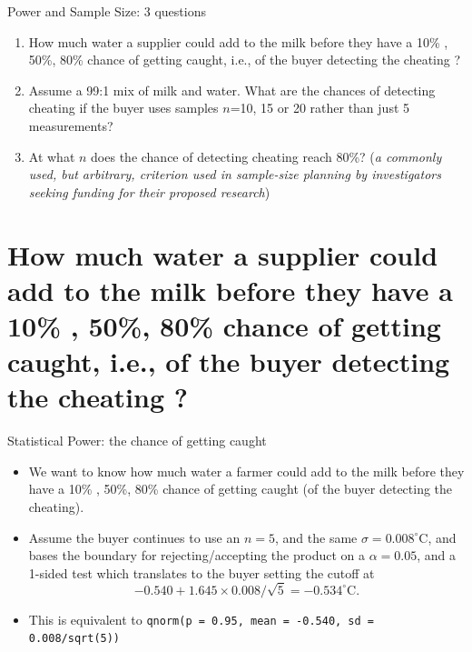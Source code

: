 \documentclass[10pt]{beamer}\usepackage[]{graphicx}\usepackage[]{color}
\begin{document}
\begin{frame}{Power and Sample Size: 3 questions}
	
	\begin{enumerate}
		\setlength\itemsep{1em}
		\item How much water a supplier could add to the milk before they have a 10\% , 50\%, 80\%
		chance of getting caught, i.e., of the buyer detecting the cheating ? \pause
		\item Assume a 99:1 mix of milk and water. What are the chances of detecting cheating if the buyer uses samples $n$=10, 15 or 20 rather than just 5 measurements? \pause
		\item At what $n$ does the chance of detecting cheating reach 80\%? (\textit{a commonly used, but arbitrary, criterion used in sample-size planning by investigators seeking funding for their proposed research})
	\end{enumerate}
	
\end{frame}


\section{How much water a supplier could add to the milk before they have a 10\% , 50\%, 80\% chance of getting caught, i.e., of the buyer detecting the cheating ?}

\begin{frame}{Statistical Power: the chance of getting caught}
	\begin{itemize}
		\setlength\itemsep{1em}
		\item We want to know how much water a farmer could add to the milk before they have a 10\% , 50\%, 80\% chance of getting caught (of the buyer detecting the cheating). 
		\item Assume the buyer continues to use an $n=5$, and the same $\sigma =0.008^{\circ}$C, and  bases the boundary for rejecting/accepting the product on a $\alpha = 0.05$, and a 1-sided test which translates to the buyer setting the cutoff at $$-0.540 + 1.645 \times 0.008/\sqrt{5}  = -0.534^{\circ}\textrm{C}.$$
		\item This is equivalent to \texttt{qnorm(p = 0.95, mean = -0.540, sd = 0.008/sqrt(5))}
	\end{itemize}
\end{frame}
\end{document}

